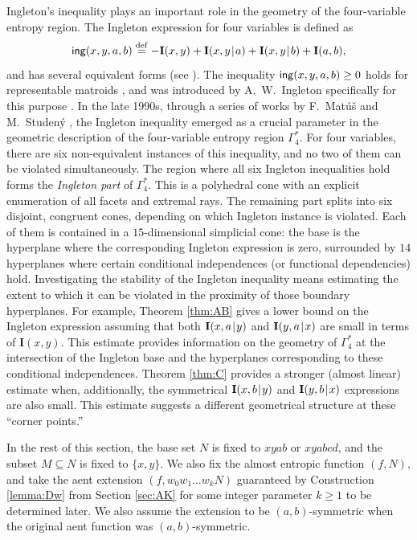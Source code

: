 \documentclass[10pt,a4paper]{amsart}
\def\|{\mskip1.5mu{|}\mskip1.5mu}
\def\I{\mathbf I}
\def\Ga#1{\Gamma^*_{\!#1}}
\newcommand\eqdef{\stackrel{\mathrm{def}}{=}}
\def\ing[#1,#2,#3,#4]{\mathsf{ing}(#1,#2,#3,#4\mkern 0mu)}
\begin{document}
Ingleton's inequality plays an important role in the geometry of the
four-variable entropy region. The Ingleton expression for four variables is
defined as
$$
   \ing[x,y,a,b] \eqdef -\I(x,y)+\I(x,y\|a)+\I(x,y\|b)+\I(a,b),
$$
and has several equivalent forms (see \cite{studeny21}). The inequality
$\ing[x,y,a,b]\ge 0$ holds for representable matroids \cite{oxley}, and was
introduced by A.~W.~Ingleton specifically for this purpose \cite{ingleton}. In
the late 1990s, through a series of works by F.~Mat\'u\v{s} and M.~Studen\'y
\cite{Ma.Stud, mat95, mat99}, the Ingleton inequality emerged as a crucial
parameter in the geometric description of the four-variable entropy region
$\Ga4$. For four variables, there are six non-equivalent instances of this
inequality, and no two of them can be violated simultaneously. The region
where all six Ingleton inequalities hold forms the \emph{Ingleton part} of
$\Ga4$. This is a polyhedral cone with an explicit enumeration of all facets
and extremal rays. The remaining part splits into six disjoint, congruent
cones, depending on which Ingleton instance is violated. Each of them is
contained in a $15$-dimensional simplicial cone: the base is the hyperplane
where the corresponding Ingleton expression is zero, surrounded by $14$
hyperplanes where certain conditional independences (or functional
dependencies) hold. Investigating the stability of the Ingleton inequality
means estimating the extent to which it can be violated in the proximity of
those boundary hyperplanes. For example, Theorem \ref{thm:AB} gives a lower
bound on the Ingleton expression assuming that both $\I(x,a\|y)$ and
$\I(y,a\|x)$ are small in terms of $\I(x,y)$. This estimate provides
information on the geometry of $\Ga4$ at the intersection of the Ingleton
base and the hyperplanes corresponding to these conditional independences.
Theorem \ref{thm:C} provides a stronger (almost linear) estimate when,
additionally, the symmetrical $\I(x,b\|y)$ and $\I(y,b\|x)$ expressions are
also small. This estimate suggests a different geometrical structure at these
``corner points.''

In the rest of this section, the base set $N$ is fixed to $xyab$ or
$xyabcd$, and the subset $M\subseteq N$ is fixed to $\{x,y\}$. We also fix the
almost entropic function $(f,N)$, and take the aent extension
$(f,w_0w_1\dots w_kN)$ guaranteed by Construction \ref{lemma:Dw} from
Section \ref{sec:AK} for some integer parameter $k\ge 1$ to be determined
later. We also assume the extension to be $(a,b)$-symmetric when the
original aent function was $(a,b)$-symmetric.
\end{document}
